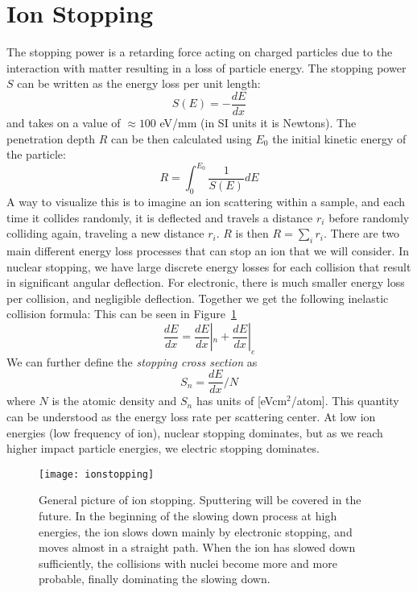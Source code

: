 \section{Ion Stopping}\label{sec:ion-stopping}
The stopping power is a retarding force acting on charged particles due to the interaction with matter resulting in a loss of particle energy.
The stopping power $S$ can be written as the energy loss per unit length:
\begin{equation}
S(E) = -\frac{dE}{dx}\label{eq:stopping}
\end{equation}
and takes on a value of $\approx 100$ eV/mm (in SI units it is Newtons).
The penetration depth $R$ can be then calculated using $E_0$ the initial kinetic energy of the particle:
\begin{equation}
R = \int_0^{E_0} \frac{1}{S(E)}dE
\end{equation}
A way to visualize this is to imagine an ion scattering within a sample, and each time it collides randomly, it is deflected and travels a distance $r_i$ before randomly colliding again, traveling a new distance $r_i$. $R$ is then $R = \sum_i r_i$.
There are two main different energy loss processes that can stop an ion that we will consider.
In nuclear stopping, we have large discrete energy losses for each collision that result in significant angular deflection.
For electronic, there is much smaller energy loss per collision, and negligible deflection.
Together we get the following inelastic collision formula:
This can be seen in Figure~\ref{fig:ionstop}
$$ \frac{dE}{dx} = \frac{dE}{dx} |_n + \frac{dE}{dx}|_e $$
We can further define the \textit{stopping cross section} as $$S_n = \frac{dE}{dx} / N$$ where $N$ is the atomic density and $S_n$ has units of [eVcm$^2$/atom].
This quantity can be understood as the energy loss rate per scattering center.
At low ion energies (low frequency of ion), nuclear stopping dominates, but as we reach higher impact particle energies, we electric stopping dominates.

\begin{figure}
	\centering
	\texttt{[image: ionstopping]}
	\caption{General picture of ion stopping. Sputtering will be covered in the future.  In the beginning of the slowing down process at high energies, the ion slows down mainly by electronic stopping, and moves almost in a straight path. When the ion has slowed down sufficiently, the collisions with nuclei become more and more probable, finally dominating the slowing down. \cite{4}}
	\label{fig:ionstop}
\end{figure}


